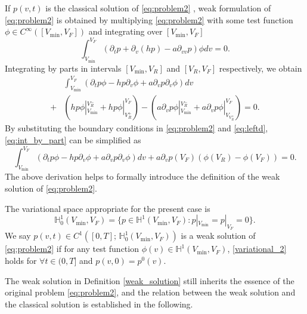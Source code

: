 If $p(v,t)$ is the classical solution of \eqref{eq:problem2} , weak formulation of \eqref{eq:problem2} is obtained by multiplying \eqref{eq:problem2} with some test function $\phi \in C^{\infty}([V_{\min}, V_F])$ and integrating over $[V_{\min}, V_F]$
\begin{equation}
    \label{variational_1}
    \int_{V_{\min}}^{V_{F}} \left(
    \partial_{t}p+\partial_{v}(hp)-a\partial_{v v}p\right)\phi dv =0.
\end{equation}
Integrating by parts in intervals $[V_{\min},V_R]$ and $[V_R,V_F]$ respectively, we obtain 
\begin{equation}
    \label{eq:int_by_part}
\begin{aligned}
    &\int_{V_{\min}}^{V_{F}} \left(\partial_tp \phi-hp\partial_v\phi+a\partial_vp\partial_v\phi\right) dv\\
    +&\left(hp\phi|_{V_{\min}}^{V_R^-}+hp\phi|_{V_R^+}^{V_F}\right)-\left(a\partial_vp\phi|_{V_{\min}}^{V_R^-}+a\partial_vp\phi|_{V_{V_R^+}}^{V_F}\right)=0.
\end{aligned}
\end{equation}
By substituting the boundary conditions in \eqref{eq:problem2} and \eqref{eq:leftd}, \eqref{eq:int_by_part} can be simplified as
\begin{equation}
    \label{variational_2}
    \int_{V_{\min}}^{V_{F}} \left(\partial_tp \phi-hp\partial_v\phi+a\partial_vp\partial_v\phi\right) dv+a\partial_vp(V_F)\left(\phi(V_R)-\phi(V_F)\right)=0.
\end{equation}
The above derivation helps to formally introduce the definition of the weak solution of \eqref{eq:problem2}.
\begin{definition} \label{weak_solution}
    The variational space appropriate for the present case is
    \begin{equation}
        \label{eq:variational_space}
        \mathbb{H}^{1}_0(V_{\min},V_F)=\{p\in \mathbb{H}^{1}(V_{\min},V_F):p|_{V_{\min}}=p|_{V_F}=0\}.
    \end{equation}
    We say  $p(v,t)\in  C^{1}([0,T];\, \mathbb{H}^{1}_0(V_{\min},V_F)) $ is a weak solution of \eqref{eq:problem2}  if for any test function $\phi(v) \in \mathbb{H}^{1}(V_{\min},V_F)$, \eqref{variational_2} holds for $\forall t\in (0,T]$ and $p(v,0)=p^0(v)$. 
\end{definition}
The weak solution in Definition \ref{weak_solution} still inherits the essence of the original problem \eqref{eq:problem2}, and the relation between the weak solution and the classical solution is established in the following.
